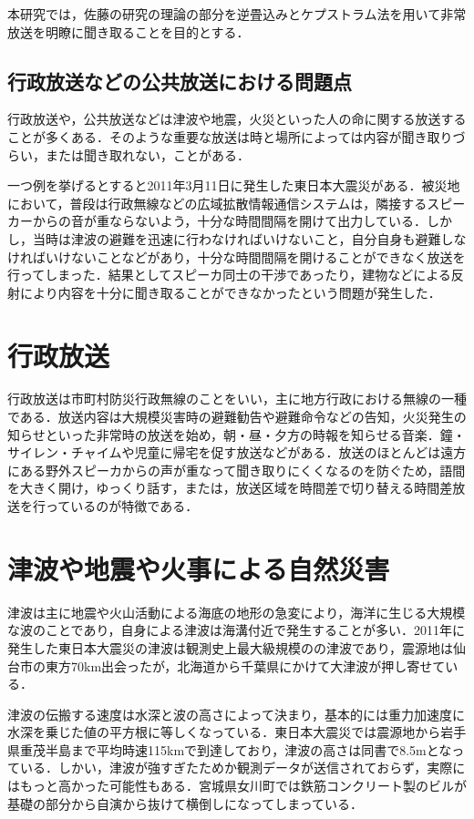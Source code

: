 \documentclass[a4j,11pt]{jsarticle}
\begin{document}
本研究では，佐藤\cite{oka2}の研究の理論の部分を逆畳込みとケプストラム法を用いて非常放送を明瞭に聞き取ることを目的とする．

\subsection{行政放送などの公共放送における問題点}
行政放送や，公共放送などは津波や地震，火災といった人の命に関する放送することが多くある．そのような重要な放送は時と場所によっては内容が聞き取りづらい，または聞き取れない，ことがある．

一つ例を挙げるとすると2011年3月11日に発生した東日本大震災がある．被災地において，普段は行政無線などの広域拡散情報通信システムは，隣接するスピーカーからの音が重ならないよう，十分な時間間隔を開けて出力している．しかし，当時は津波の避難を迅速に行わなければいけないこと，自分自身も避難しなければいけないことなどがあり，十分な時間間隔を開けることができなく放送を行ってしまった．結果としてスピーカ同士の干渉であったり，建物などによる反射により内容を十分に聞き取ることができなかったという問題が発生した．


\newpage

\section{行政放送}
行政放送は市町村防災行政無線のことをいい，主に地方行政における無線の一種である．放送内容は大規模災害時の避難勧告や避難命令などの告知，火災発生の知らせといった非常時の放送を始め，朝・昼・夕方の時報を知らせる音楽．鐘・サイレン・チャイムや児童に帰宅を促す放送などがある．放送のほとんどは遠方にある野外スピーカからの声が重なって聞き取りにくくなるのを防ぐため，語間を大きく開け，ゆっくり話す，または，放送区域を時間差で切り替える時間差放送を行っているのが特徴である．

\newpage

\section{津波や地震や火事による自然災害}
津波は主に地震や火山活動による海底の地形の急変により，海洋に生じる大規模な波のことであり，自身による津波は海溝付近で発生することが多い．2011年に発生した東日本大震災の津波は観測史上最大級規模のの津波であり，震源地は仙台市の東方70km出会ったが，北海道から千葉県にかけて大津波が押し寄せている．

津波の伝搬する速度は水深と波の高さによって決まり，基本的には重力加速度に水深を乗じた値の平方根に等しくなっている．東日本大震災では震源地から岩手県重茂半島まで平均時速115kmで到達しており，津波の高さは同書で8.5mとなっている．しかい，津波が強すぎたためか観測データが送信されておらず，実際にはもっと高かった可能性もある．宮城県女川町では鉄筋コンクリート製のビルが基礎の部分から自演から抜けて横倒しになってしまっている．
\end{document}
